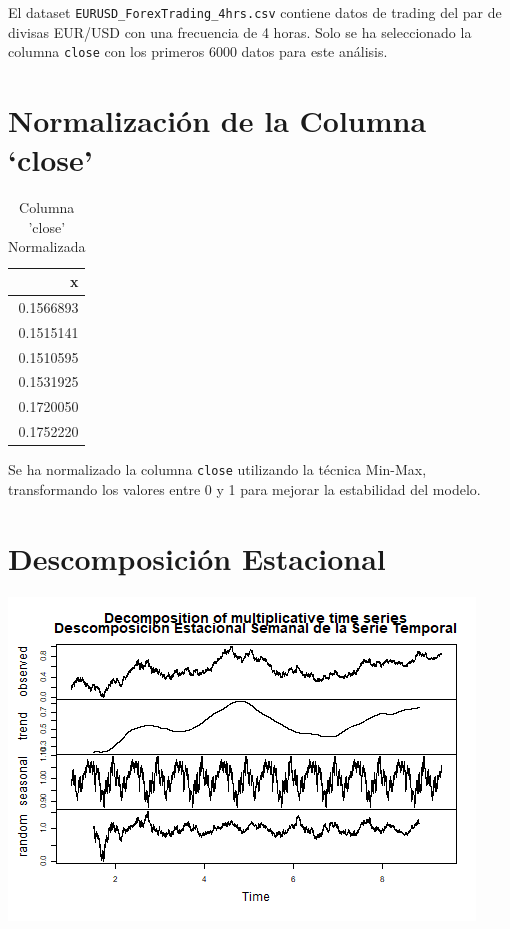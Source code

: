 \documentclass[
]{book}
\begin{document}
El dataset \texttt{EURUSD\_ForexTrading\_4hrs.csv} contiene datos de trading del par de divisas EUR/USD con una frecuencia de 4 horas. Solo se ha seleccionado la columna \texttt{close} con los primeros 6000 datos para este análisis.

\section{Normalización de la Columna `close'}\label{normalizaciuxf3n-de-la-columna-close}

\begin{table}
\centering
\caption{\label{tab:normalizar-close}Columna 'close' Normalizada}
\centering
\begin{tabular}[t]{r}
\hline
x\\
\hline
0.1566893\\
\hline
0.1515141\\
\hline
0.1510595\\
\hline
0.1531925\\
\hline
0.1720050\\
\hline
0.1752220\\
\hline
\end{tabular}
\end{table}

Se ha normalizado la columna \texttt{close} utilizando la técnica Min-Max, transformando los valores entre 0 y 1 para mejorar la estabilidad del modelo.

\section{Descomposición Estacional}\label{descomposiciuxf3n-estacional}

\includegraphics{bookdown_time_series_files/figure-latex/descomposicion-estacional-1.png}
\end{document}
